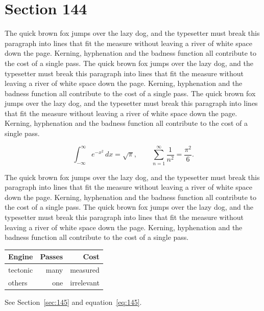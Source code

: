 \documentclass{article}
\begin{document}
\section{Section 144}
\label{sec:144}
The quick brown fox jumps over the lazy dog, and the typesetter must break this paragraph into lines that fit the measure without leaving a river of white space down the page. Kerning, hyphenation and the badness function all contribute to the cost of a single pass. The quick brown fox jumps over the lazy dog, and the typesetter must break this paragraph into lines that fit the measure without leaving a river of white space down the page. Kerning, hyphenation and the badness function all contribute to the cost of a single pass. The quick brown fox jumps over the lazy dog, and the typesetter must break this paragraph into lines that fit the measure without leaving a river of white space down the page. Kerning, hyphenation and the badness function all contribute to the cost of a single pass. 

\begin{equation}\label{eq:144}
\int_{-\infty}^{\infty} e^{-x^{2}}\,dx = \sqrt{\pi}, \qquad
\sum_{n=1}^{\infty} \frac{1}{n^{2}} = \frac{\pi^{2}}{6}.
\end{equation}

The quick brown fox jumps over the lazy dog, and the typesetter must break this paragraph into lines that fit the measure without leaving a river of white space down the page. Kerning, hyphenation and the badness function all contribute to the cost of a single pass. The quick brown fox jumps over the lazy dog, and the typesetter must break this paragraph into lines that fit the measure without leaving a river of white space down the page. Kerning, hyphenation and the badness function all contribute to the cost of a single pass. 

\begin{center}
\begin{tabular}{lrr}
\toprule
Engine & Passes & Cost \\
\midrule
tectonic & many & measured \\
others & one & irrelevant \\
\bottomrule
\end{tabular}
\end{center}

See Section~\ref{sec:145} and equation~\eqref{eq:145}.
\end{document}
